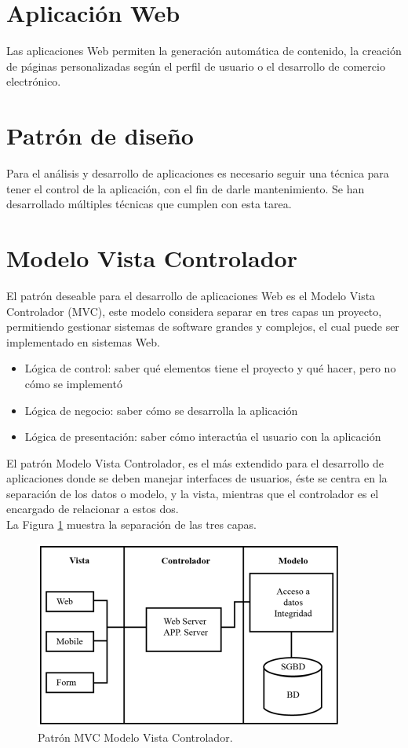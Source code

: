 


\section{Aplicación Web}
Las aplicaciones Web permiten la generación automática de contenido, la creación de páginas personalizadas según el perfil de usuario o el desarrollo de comercio electrónico.

\section{Patrón de diseño}
Para el análisis y desarrollo de aplicaciones es necesario seguir una técnica para tener el control de la aplicación, con el fin de darle mantenimiento. Se han desarrollado múltiples técnicas que cumplen con esta tarea.

\section{Modelo Vista Controlador}
El patrón deseable para el desarrollo de aplicaciones Web es el Modelo Vista Controlador (MVC), este modelo considera separar en tres capas un proyecto, permitiendo gestionar sistemas de software grandes y complejos, el cual puede ser implementado en sistemas Web.

\begin{itemize}
	\item Lógica de control: saber qué elementos tiene el proyecto y qué hacer, pero no cómo se implementó
	\item Lógica de negocio: saber cómo se desarrolla la aplicación
	\item Lógica de presentación: saber cómo interactúa el usuario con la aplicación
\end{itemize}
El patrón Modelo Vista Controlador, es el más extendido para el desarrollo de aplicaciones donde se deben manejar interfaces de usuarios, éste se centra en la separación de los datos o modelo, y la vista, mientras que el controlador es el encargado de relacionar a estos dos.
\\
La Figura \ref{fig:modVisCont} muestra la separación de las tres capas.
\begin{figure}[H]
  \centering
  \includegraphics[scale=.50]{imagenes/Capitulo3/mvc.png}
  \caption{Patrón MVC Modelo Vista Controlador.}
  \label{fig:modVisCont}
\end{figure}

